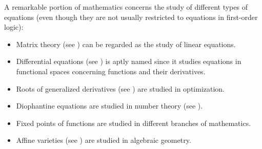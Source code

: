 \begin{remark}\label{rem:equations}
  A remarkable portion of mathematics concerns the study of different types of equations (even though they are not usually restricted to equations in first-order logic):

  \begin{itemize}
    \item Matrix theory (see ) can be regarded as the study of linear equations.
    \item Differential equations (see ) is aptly named since it studies equations in functional spaces concerning functions and their derivatives.
    \item Roots of generalized derivatives (see ) are studied in optimization.
    \item Diophantine equations are studied in number theory (see ).
    \item Fixed points of functions are studied in different branches of mathematics.
    \item Affine varieties (see ) are studied in algebraic geometry.
  \end{itemize}
\end{remark}

